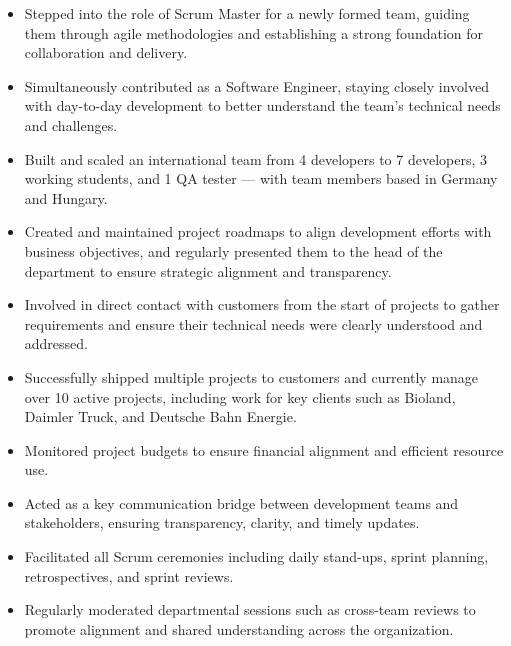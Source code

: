 \documentclass[10pt, a4paper]{cvhari}
\begin{document}
    \begin{itemize}
        \item Stepped into the role of Scrum Master for a newly formed team, guiding them through agile methodologies and establishing a strong foundation for collaboration and delivery.

        \item Simultaneously contributed as a Software Engineer, staying closely involved with day-to-day development to better understand the team’s technical needs and challenges.

        \item Built and scaled an international team from 4 developers to 7 developers, 3 working students, and 1 QA tester — with team members based in Germany and Hungary.

        \item Created and maintained project roadmaps to align development efforts with business objectives, and regularly presented them to the head of the department to ensure strategic alignment and transparency.

        \item Involved in direct contact with customers from the start of projects to gather requirements and ensure their technical needs were clearly understood and addressed.

        \item Successfully shipped multiple projects to customers and currently manage over 10 active projects, including work for key clients such as Bioland, Daimler Truck, and Deutsche Bahn Energie.

        \item Monitored project budgets to ensure financial alignment and efficient resource use.

        \item Acted as a key communication bridge between development teams and stakeholders, ensuring transparency, clarity, and timely updates.

        \item Facilitated all Scrum ceremonies including daily stand-ups, sprint planning, retrospectives, and sprint reviews.

        \item Regularly moderated departmental sessions such as cross-team reviews to promote alignment and shared understanding across the organization.
        
    \end{itemize}
\end{document}
